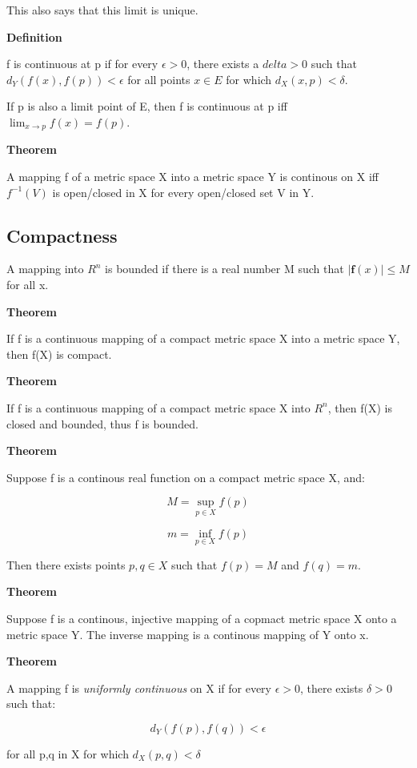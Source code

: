 \documentclass[11pt]{article}
\begin{document}
This also says that this limit is unique.

\textbf{Definition}

f is continuous at p if for every \(\epsilon > 0\), there exists a \(delta > 0\) such that \(d_Y(f(x),f(p)) < \epsilon\) for all points \(x \in E\) for which \(d_X(x,p) < \delta\).

If p is also a limit point of E, then f is continuous at p iff \(\lim_{x \to p} f(x) = f(p)\).

\textbf{Theorem}

A mapping f of a metric space X into a metric space Y is continous on X iff \(f^{-1}(V)\) is open/closed in X for every open/closed set V in Y.


\subsection{Compactness}
\label{sec:orgb8777d2}

A mapping into \(R^n\) is bounded if there is a real number M such that \(| \bm{f}(x) | \leq M\) for all x.

\textbf{Theorem}

If f is a continuous mapping of a compact metric space X into a metric space Y, then f(X) is compact.

\textbf{Theorem}

If f is a continuous mapping of a compact metric space X into \(R^n\), then f(X) is closed and bounded, thus f is bounded.

\textbf{Theorem}

Suppose f is a continous real function on a compact metric space X, and:

\[
M = \sup_{p\in X} f(p)
\]

\[
m = \inf_{p\in X}f(p)
\]

Then there exists points \(p,q \in X\) such that \(f(p) = M\) and \(f(q) = m\).

\textbf{Theorem}

Suppose f is a continous, injective mapping of a copmact metric space X onto a metric space Y. The inverse mapping is a continous mapping of Y onto x.

\textbf{Theorem}

A mapping f is \emph{uniformly continuous} on X if for every \(\epsilon > 0\), there exists \(\delta > 0\) such that:

\[
d_Y(f(p),f(q)) < \epsilon
\]

for all p,q in X for which \(d_X(p,q) < \delta\)
\end{document}
